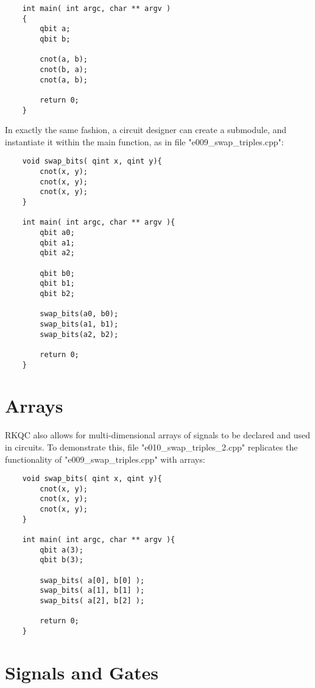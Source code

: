 \begin{lstlisting}
    int main( int argc, char ** argv )
    {
        qbit a;
        qbit b;

        cnot(a, b);
        cnot(b, a);
        cnot(a, b);

        return 0;
    }
\end{lstlisting}

In exactly the same fashion, a circuit designer can create a submodule, and instantiate it within the main function, as in file "e009\_swap\_triples.cpp":

\begin{lstlisting}
    void swap_bits( qint x, qint y){
        cnot(x, y);
        cnot(x, y);
        cnot(x, y);
    }

    int main( int argc, char ** argv ){
        qbit a0;
        qbit a1;
        qbit a2;

        qbit b0;
        qbit b1;
        qbit b2;

        swap_bits(a0, b0);
        swap_bits(a1, b1);
        swap_bits(a2, b2);

        return 0;
    }
\end{lstlisting}

\section{Arrays}

RKQC also allows for multi-dimensional arrays of signals to be declared and used in circuits. To demonstrate this, file "e010\_swap\_triples\_2.cpp" replicates the functionality of "e009\_swap\_triples.cpp" with arrays:

\begin{lstlisting}
    void swap_bits( qint x, qint y){
        cnot(x, y);
        cnot(x, y);
        cnot(x, y);
    }

    int main( int argc, char ** argv ){
        qbit a(3);
        qbit b(3);

        swap_bits( a[0], b[0] );
        swap_bits( a[1], b[1] );
        swap_bits( a[2], b[2] );

        return 0;
    }
\end{lstlisting}

\section{Signals and Gates}

